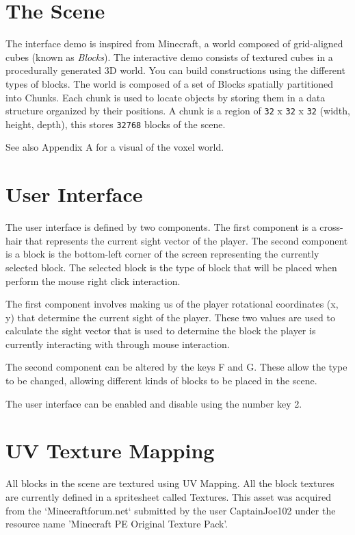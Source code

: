 \documentclass{book}
\begin{document}
\section{The Scene}
The interface demo is inspired from Minecraft, a world composed of grid-aligned cubes (known as \textit{Blocks}).  The interactive demo consists of textured cubes in a procedurally generated 3D world.  You can build constructions using the different types of blocks.  The world is composed of a set of Blocks spatially partitioned into Chunks.  Each chunk is used to locate objects by storing them in a data structure organized by their positions.   A chunk is a region of \texttt{32} x \texttt{32} x \texttt{32} (width, height, depth), this stores \texttt{32768} blocks of the scene.
  
See also Appendix A for a visual of the voxel world.
  
\section{User Interface}
The user interface is defined by two components.  The first component is a cross-hair that represents the current sight vector of the player.  The second component is a block is the bottom-left corner of the screen representing the currently selected block.  The selected block is the type of block that will be placed when perform the mouse right click interaction.
    
The first component involves making us of the player rotational coordinates (x, y) that determine the current sight of the player.  These two values are used to calculate the sight vector that is used to determine the block the player is currently interacting with through mouse interaction.
    
The second component can be altered by the keys F and G.  These allow the type to be changed, allowing different kinds of blocks to be placed in the scene.
    
The user interface can be enabled and disable using the number key 2. 
    
\section{UV Texture Mapping}
All blocks in the scene are textured using UV Mapping.  All the block textures are currently defined in a spritesheet called Textures.  This asset was acquired from the `Minecraftforum.net`
submitted by the user CaptainJoe102 under the resource name 'Minecraft PE Original Texture Pack'.
    
\end{document}
